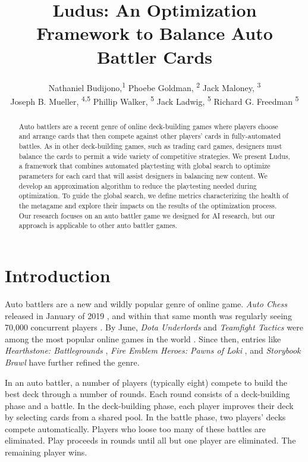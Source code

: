 \documentclass[letterpaper]{article} %
\title{{\sc Ludus}: An Optimization Framework to Balance Auto Battler Cards}
\author {
    Nathaniel Budijono\equalcontrib,\textsuperscript{\rm 1}
    Phoebe Goldman\equalcontrib, \textsuperscript{\rm 2}
    Jack Maloney\equalcontrib, \textsuperscript{\rm 3} \\
    Joseph B. Mueller, \textsuperscript{\rm 4,5}
    Phillip Walker, \textsuperscript{\rm 5}
    Jack Ladwig, \textsuperscript{\rm 5}
    Richard G. Freedman \textsuperscript{\rm 5}
}
\begin{document}
\maketitle

\begin{abstract}
  Auto battlers are a recent genre of online deck-building games where players choose and arrange cards that then compete against other players' cards in fully-automated battles. As in other deck-building games, such as trading card games, designers must balance the cards to permit a wide variety of competitive strategies.  We present {\sc Ludus}, a framework that combines automated playtesting with global search to optimize parameters for each card that will assist designers in balancing new content.  We develop an approximation algorithm to reduce the playtesting needed during optimization.  To guide the global search, we define metrics characterizing the health of the metagame and explore their impacts on the results of the optimization process.  Our research focuses on an auto battler game we designed for AI research, but our approach is applicable to other auto battler games.
\end{abstract}

\section{Introduction} \label{sec:introduction}
Auto battlers are a new and wildly popular genre of online game.
\textit{Auto Chess} released in January of 2019 \cite{autochess}, and
within that same month was regularly seeing 70,000 concurrent players
\cite{auto-chess-what-and-why}. By June, \textit{Dota Underlords} and
\textit{Teamfight Tactics} were among the most popular online games in
the world \cite{autobattler-popularity}. Since then, entries like
\textit{Hearthstone: Battlegrounds} \cite{hearthstone-battlegrounds},
\textit{Fire Emblem Heroes: Pawns of Loki} \cite{feh-pawnsOfLoki-video},
and \textit{Storybook Brawl} \cite{storybook-brawl} have further refined the genre.


In an auto battler, a number of players (typically eight) compete to
build the best deck through a number of rounds. Each round consists of
a deck-building phase and a battle. In the deck-building phase, each
player improves their deck by selecting cards from a shared pool. In
the battle phase, two players' decks compete automatically. Players
who loose too many of these battles are eliminated. Play proceeds in
rounds until all but one player are eliminated. The remaining player
wins.
\end{document}

